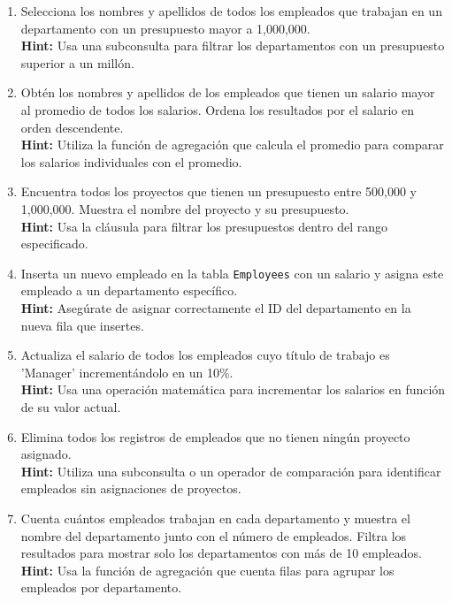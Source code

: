 \begin{enumerate}

    \item Selecciona los nombres y apellidos de todos los empleados que trabajan en un departamento con un presupuesto mayor a 1,000,000.
    \\
    \textbf{Hint:} Usa una subconsulta para filtrar los departamentos con un presupuesto superior a un millón.

    \item Obtén los nombres y apellidos de los empleados que tienen un salario mayor al promedio de todos los salarios. Ordena los resultados por el salario en orden descendente.
    \\
    \textbf{Hint:} Utiliza la función de agregación que calcula el promedio para comparar los salarios individuales con el promedio.

    \item Encuentra todos los proyectos que tienen un presupuesto entre 500,000 y 1,000,000. Muestra el nombre del proyecto y su presupuesto.
    \\
    \textbf{Hint:} Usa la cláusula para filtrar los presupuestos dentro del rango especificado.

    \item Inserta un nuevo empleado en la tabla \texttt{Employees} con un salario y asigna este empleado a un departamento específico.
    \\
    \textbf{Hint:} Asegúrate de asignar correctamente el ID del departamento en la nueva fila que insertes.

    \item Actualiza el salario de todos los empleados cuyo título de trabajo es 'Manager' incrementándolo en un 10\%.
    \\
    \textbf{Hint:} Usa una operación matemática para incrementar los salarios en función de su valor actual.

    \item Elimina todos los registros de empleados que no tienen ningún proyecto asignado.
    \\
    \textbf{Hint:} Utiliza una subconsulta o un operador de comparación para identificar empleados sin asignaciones de proyectos.

    \item Cuenta cuántos empleados trabajan en cada departamento y muestra el nombre del departamento junto con el número de empleados. Filtra los resultados para mostrar solo los departamentos con más de 10 empleados.
    \\
    \textbf{Hint:} Usa la función de agregación que cuenta filas para agrupar los empleados por departamento.


\end{enumerate}
